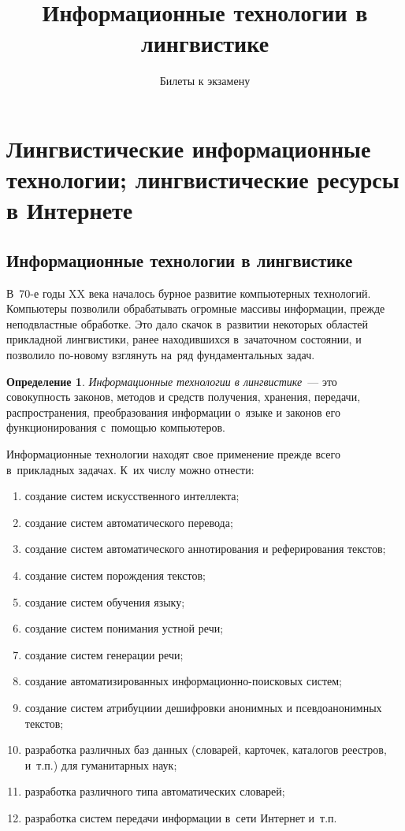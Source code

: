 \documentclass[12pt]{article}
\theoremstyle{definition}
\newtheorem*{defn}{Определение}
\theoremstyle{remark}
\numberwithin{equation}{section}
\begin{document}
\title{Информационные технологии в лингвистике}%
\author{Билеты к экзамену}%
\date{}
\maketitle
\section{Лингвистические информационные технологии; лингвистические
ресурсы в Интернете}
\subsection{Информационные технологии в лингвистике}
В~70-е годы XX века началось бурное развитие компьютерных технологий.
Компьютеры позволили обрабатывать огромные массивы информации, прежде
неподвластные обработке. Это дало скачок в~развитии некоторых областей
прикладной лингвистики, ранее находившихся в~зачаточном состоянии, и
позволило по-новому взглянуть на~ряд фундаментальных задач.
\begin{defn}
    {\sl Информационные технологии в лингвистике}~--- это совокупность
    законов, методов и средств получения, хранения, передачи,
    распространения, преобразования информации о~языке и законов 
    его функционирования с~помощью компьютеров.
\end{defn}

Информационные технологии находят свое применение прежде всего
в~прикладных задачах. К~их числу можно отнести:
\begin{enumerate}
    \item создание систем искусственного интеллекта;
    \item создание систем автоматического перевода;
    \item создание систем автоматического аннотирования и реферирования
    текстов;
    \item создание систем порождения текстов;
    \item создание систем обучения языку;
    \item создание систем понимания устной речи;
    \item создание систем генерации речи;
    \item создание автоматизированных информационно-поисковых систем;
    \item создание систем атрибуциии дешифровки анонимных и
    псевдоанонимных текстов;
    \item разработка различных баз данных (словарей, карточек, каталогов
    реестров, и~т.п.) для гуманитарных наук;
    \item разработка различного типа автоматических словарей;
    \item разработка систем передачи информации в~сети Интернет и~т.п.
\end{enumerate}
\end{document}
